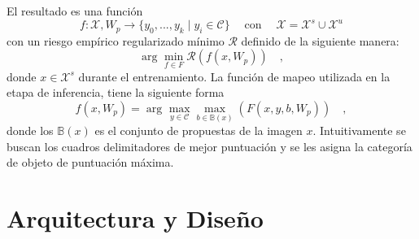 El resultado es una función 
\[f : \mathcal{X}, W_p  \to \{y_0,...,y_k\mid y_i \in \mathcal{C}\} \quad \operatorname{con}\quad \mathcal{X} =  \mathcal{X}^s \cup \mathcal{X}^u\] 
con un riesgo empírico regularizado mínimo $\mathcal{R}$ definido de la siguiente manera: 
\[ \arg_{}\min_{f \in F} \mathcal{R}(f(x,W_p))\quad, \] 
donde $x \in \mathcal{X}^s$ durante el entrenamiento. La función de mapeo utilizada en la etapa de inferencia, tiene la siguiente forma \[ f(x,W_p) = \arg_{}\max_{y \in \mathcal{C}}\max_{b \in \mathbb{B}(x)} (F(x,y,b,W_p)) \quad,\] donde los $\mathbb{B}(x)$ es el conjunto de propuestas de la imagen $x$. Intuitivamente se buscan los cuadros delimitadores de mejor puntuación y se les asigna la categoría de objeto de puntuación máxima.

\section{Arquitectura y Diseño} \label{sec:arquitecturaydiseno}

